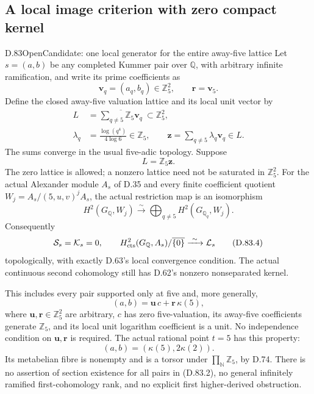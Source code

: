 \subsection{A local image criterion with zero compact kernel}

\begin{statement}{D.83}{Open}{Candidate: one local generator for the entire away-five lattice}
Let \(s=(a,b)\) be any completed Kummer pair over \(\mathbb Q\),
with arbitrary infinite ramification, and write its prime coefficients as
\[
 \mathbf v_q=(a_q,b_q)\in\mathbb Z_5^2,
 \qquad \mathbf r=\mathbf v_5.
\]
Define the closed away-five valuation lattice and its local unit vector by
\[
 \begin{split}
 L&=\overline{\sum_{q\ne5}\mathbb Z_5\mathbf v_q}
                                      \ \subset\mathbb Z_5^2,\\
 \lambda_q&=\frac{\log(q^4)}{4\log6}\in\mathbb Z_5,
 \qquad
 \mathbf z=\sum_{q\ne5}\lambda_q\mathbf v_q\in L.
 \end{split}                                                   \tag{D.83.1}
\]
The sums converge in the usual five-adic topology. Suppose
\[
                           L=\mathbb Z_5\mathbf z.              \tag{D.83.2}
\]
The zero lattice is allowed; a nonzero lattice need not be
saturated in \(\mathbb Z_5^2\). For the actual Alexander module
\(A_s\) of D.35 and every finite coefficient quotient
\(W_j=A_s/(5,u,v)^jA_s\), the actual restriction map is an
isomorphism
\[
 H^2(G_{\mathbb Q},W_j)
       \xrightarrow{\ \sim\ }
       \bigoplus_{q\ne5}H^2(G_{\mathbb Q_q},W_j).                 \tag{D.83.3}
\]
Consequently
\[
 \mathcal S_s=\mathcal K_s=0,
 \qquad
 H^2_{\rm cts}(G_{\mathbb Q},A_s)/\overline{\{0\}}
       \xrightarrow{\ \sim\ }\mathcal L_s                       \tag{D.83.4}
\]
topologically, with exactly D.63's local convergence condition.
The actual continuous second cohomology still has D.62's
nonzero nonseparated kernel.

This includes every pair supported only at five and, more generally,
\[
 (a,b)=\mathbf u\,c+\mathbf r\,\kappa(5),                         \tag{D.83.5}
\]
where \(\mathbf u,\mathbf r\in\mathbb Z_5^2\) are arbitrary,
\(c\) has zero five-valuation, its away-five coefficients generate
\(\mathbb Z_5\), and its local unit logarithm coefficient is a unit.
No independence condition on \(\mathbf u,\mathbf r\) is required.
The actual rational point \(t=5\) has this property:
\[
                  (a,b)=(\kappa(5),2\kappa(2)).                  \tag{D.83.6}
\]
Its metabelian fibre is nonempty and is a torsor under
\(\prod_{\mathbb N}\mathbb Z_5\), by D.74.
There is no assertion of section existence for all pairs in
(D.83.2), no general infinitely ramified first-cohomology rank,
and no explicit first higher-derived obstruction.
\end{statement}

